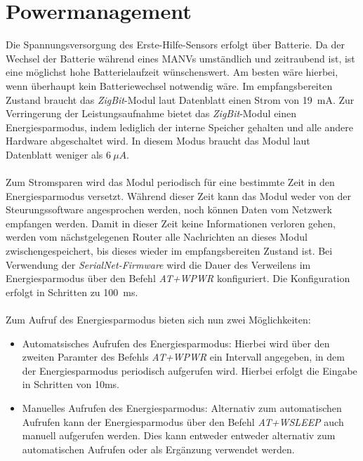     \section{Powermanagement}\label{analyse_powermanagement}
        Die Spannungsversorgung des Erste-Hilfe-Sensors erfolgt über Batterie. Da der Wechsel der Batterie
        während eines MANVs umständlich und zeitraubend ist, ist eine möglichst hohe Batterielaufzeit
        wünschenswert. Am besten wäre hierbei, wenn überhaupt kein Batteriewechsel notwendig wäre. Im
        empfangsbereiten Zustand braucht das \emph{ZigBit}-Modul laut Datenblatt einen Strom von 19~mA.
        Zur Verringerung der Leistungsaufnahme bietet das \emph{ZigBit}-Modul einen Energiesparmodus,
        indem lediglich der interne Speicher gehalten und alle andere Hardware abgeschaltet wird. In
        diesem Modus braucht das Modul laut Datenblatt weniger als $6~\mu{}A$.\\
        \\
        Zum Stromsparen wird das Modul periodisch für eine bestimmte Zeit in den
        Energiesparmodus versetzt. Während dieser Zeit kann das Modul weder von der Steurungssoftware angesprochen
        werden, noch können Daten vom Netzwerk empfangen werden. Damit in dieser Zeit keine Informationen
        verloren gehen, werden vom nächstgelegenen Router alle Nachrichten an dieses Modul zwischengespeichert,
        bis dieses wieder im empfangsbereiten Zustand ist. Bei Verwendung der \emph{SerialNet-Firmware} wird
        die Dauer des Verweilens im Energiesparmodus über den Befehl \emph{AT+WPWR} konfiguriert. Die Konfiguration
        erfolgt in Schritten zu 100~ms.\\
        \\
        Zum Aufruf des Energiesparmodus bieten sich nun zwei Möglichkeiten:

        \begin{itemize}
            \item{Automatsisches Aufrufen des Energiesparmodus:} Hierbei wird über den zweiten Paramter
            des Befehls \emph{AT+WPWR} ein Intervall angegeben, in dem der Energiesparmodus periodisch
            aufgerufen wird. Hierbei erfolgt die Eingabe in Schritten von 10ms.

            \item{Manuelles Aufrufen des Energiesparmodus:} Alternativ zum automatischen Aufrufen kann
            der Energiesparmodus über den Befehl \emph{AT+WSLEEP} auch manuell aufgerufen werden. Dies
            kann entweder entweder alternativ zum automatischen Aufrufen oder als Ergänzung verwendet
            werden.

        \end{itemize}

